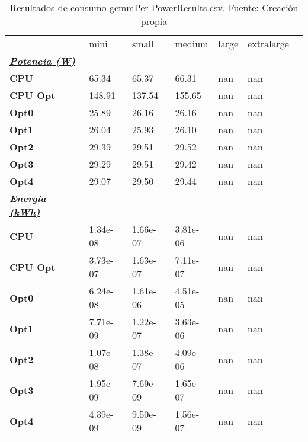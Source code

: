 \begin{table}[H]
    \centering
    \begin{tabular}{lllllll}
    \rowcolor[HTML]{DAE8FC} \ & mini & small & medium & 	large & 	extralarge \\
    \cellcolor[HTML]{DAE8FC} \textbf{\textbf{{\emph{{\underline{{Potencia (W)}}}}}}} &  &  &  & 	 & 	 \\
    \rowcolor[HTML]{EFEFEF} \cellcolor[HTML]{DAE8FC} \textbf{CPU} & 65.34 & 65.37 & 66.31 & 	nan & 	nan \\
    \cellcolor[HTML]{DAE8FC} \textbf{CPU Opt} & 148.91 & 137.54 & 155.65 & 	nan & 	nan \\
    \rowcolor[HTML]{EFEFEF} \cellcolor[HTML]{DAE8FC} \textbf{Opt0} & 25.89 & 26.16 & 26.16 & 	nan & 	nan \\
    \cellcolor[HTML]{DAE8FC} \textbf{Opt1} & 26.04 & 25.93 & 26.10 & 	nan & 	nan \\
    \rowcolor[HTML]{EFEFEF} \cellcolor[HTML]{DAE8FC} \textbf{Opt2} & 29.39 & 29.51 & 29.52 & 	nan & 	nan \\
    \cellcolor[HTML]{DAE8FC} \textbf{Opt3} & 29.29 & 29.51 & 29.42 & 	nan & 	nan \\
    \rowcolor[HTML]{EFEFEF} \cellcolor[HTML]{DAE8FC} \textbf{Opt4} & 29.07 & 29.50 & 29.44 & 	nan & 	nan \\
    \cellcolor[HTML]{DAE8FC} \textbf{\textbf{{\emph{{\underline{{Energía (kWh)}}}}}}} &  &  &  & 	 & 	 \\
    \rowcolor[HTML]{EFEFEF} \cellcolor[HTML]{DAE8FC} \textbf{CPU} & 1.34e-08 & 1.66e-07 & 3.81e-06 & 	nan & 	nan \\
    \cellcolor[HTML]{DAE8FC} \textbf{CPU Opt} & 3.73e-07 & 1.63e-07 & 7.11e-07 & 	nan & 	nan \\
    \rowcolor[HTML]{EFEFEF} \cellcolor[HTML]{DAE8FC} \textbf{Opt0} & 6.24e-08 & 1.61e-06 & 4.51e-05 & 	nan & 	nan \\
    \cellcolor[HTML]{DAE8FC} \textbf{Opt1} & 7.71e-09 & 1.22e-07 & 3.63e-06 & 	nan & 	nan \\
    \rowcolor[HTML]{EFEFEF} \cellcolor[HTML]{DAE8FC} \textbf{Opt2} & 1.07e-08 & 1.38e-07 & 4.09e-06 & 	nan & 	nan \\
    \cellcolor[HTML]{DAE8FC} \textbf{Opt3} & 1.95e-09 & 7.69e-09 & 1.65e-07 & 	nan & 	nan \\
    \rowcolor[HTML]{EFEFEF} \cellcolor[HTML]{DAE8FC} \textbf{Opt4} & 4.39e-09 & 9.50e-09 & 1.56e-07 & 	nan & 	nan \\
    \end{tabular}
    \caption[Resultados de consumo gemmPer PowerResults.csv]{{Resultados de consumo gemmPer PowerResults.csv. Fuente: Creación propia}}
    \label{table_global_gemmPer_PowerResults_data}
\end{table}